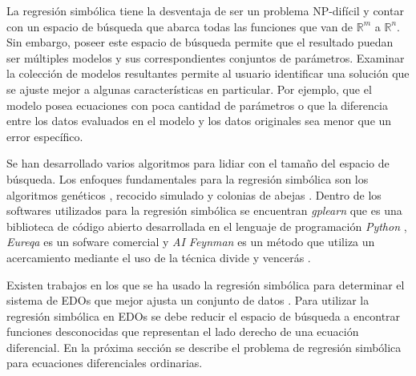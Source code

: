 La regresión simbólica tiene la desventaja de ser un problema NP-difícil \cite{virgolin2022symbolic} y contar con un espacio de búsqueda que abarca todas las funciones que van de $\mathbb{R}^m$ a $\mathbb{R}^n$. Sin embargo, poseer este espacio de búsqueda permite que el resultado puedan ser múltiples modelos y sus correspondientes conjuntos de parámetros. Examinar la colección de modelos resultantes permite al usuario identificar una solución que se ajuste mejor a algunas características en particular. Por ejemplo, que el modelo posea ecuaciones con poca cantidad de parámetros o que la diferencia entre los datos evaluados en el modelo y los datos originales sea menor que un error específico.



Se han desarrollado varios algoritmos para lidiar con el tamaño del espacio de búsqueda. Los enfoques fundamentales para la regresión simbólica son los algoritmos genéticos \cite{koza1994genetic, schmidt2013eureqa, gaucel2014learning}, recocido simulado \cite{turing_bot} y colonias de abejas \cite{multihive,karaboga2010artificial}. Dentro de los softwares utilizados para la regresión simbólica se encuentran \textit{gplearn} que es una biblioteca de código abierto desarrollada en el lenguaje de programación \textit{Python} \cite{gplearn}, \textit{Eureqa} es un sofware  comercial \cite{schmidt2013eureqa} y \textit{AI Feynman} es un método que utiliza un acercamiento mediante el uso de la técnica divide y vencerás \cite{udrescu2020ai}.

Existen trabajos en los que se ha usado la regresión simbólica para determinar el sistema de EDOs que mejor ajusta un conjunto de datos \cite{koza1994genetic, iba2008inference, gaucel2014learning, kronberger2019identification}. Para utilizar la regresión simbólica en EDOs se debe reducir el espacio de búsqueda a encontrar funciones desconocidas que representan el lado derecho de una ecuación diferencial. En la próxima sección se describe el problema de regresión simbólica para ecuaciones diferenciales ordinarias.

